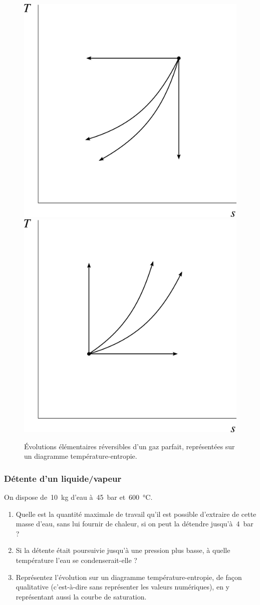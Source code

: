 	\begin{figure}[htp] %
		\begin{center}
			\includegraphics[width=0.6\columnwidth]{images/exo_ts_elementaires1.png}
			\includegraphics[width=0.6\columnwidth]{images/exo_ts_elementaires2.png}
		\end{center}
		\caption{Évolutions élémentaires réversibles d’un gaz parfait, représentées sur un diagramme température-entropie.}
		\label{fig_tsel}
	\end{figure}


\subsubsection{Détente d’un liquide/vapeur}
\label{exo_detente_liquide_vapeur}

	On dispose de~\SI{10}{\kilogram} d’eau à~\SI{45}{\bar} et~\SI{600}{\degreeCelsius}.
	
	\begin{enumerate}
		\item Quelle est la quantité maximale de travail qu’il est possible d’extraire de cette masse d’eau, sans lui fournir de chaleur, si on peut la détendre jusqu’à~\SI{4}{\bar} ?
		\item Si la détente était poursuivie jusqu’à une pression plus basse, à quelle température l’eau se condenserait-elle ?
		\item Représentez l’évolution sur un diagramme température-entropie, de façon qualitative (c’est-à-dire sans représenter les valeurs numériques), en y représentant aussi la courbe de saturation.
	\end{enumerate}



